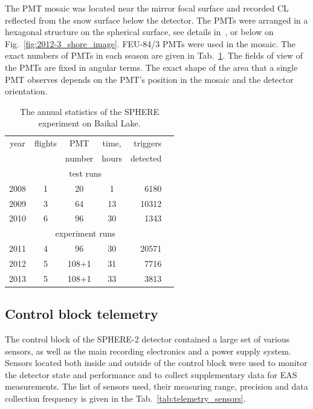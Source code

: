 \documentclass[preprint,5p,times]{elsarticle}
\begin{document}
The PMT mosaic was located near the mirror focal surface and recorded CL reflected from the snow surface below the detector. The PMTs were arranged in a hexagonal structure on the spherical surface, see details in~\cite{Ant20}, or below on Fig.~\ref{fig:2012-3_shore_image}. FEU-84/3 PMTs were used in the mosaic. The exact numbers of PMTs in each season are given in Tab.~\ref{tab:statistics}. The fields of view of the PMTs are fixed in angular terms. The exact shape of the area that a single PMT observes depends on the PMT's position in the mosaic and the detector orientation.

\begin{table}[tb]
\centering
\caption{The annual statistics of the SPHERE experiment on Baikal Lake.
}
\label{tab:statistics}
\vspace{1pc}
\begin{tabular}{|c||c|c|c|r|r|}
    \hline
    year  & flights & PMT    & time, & triggers \\ 
          &         & number & hours & detected \\ 
    \hline \hline
    \multicolumn{5}{|c|}{test runs} \\
    \hline
    2008 & 1 &  20 &  1 &  6180 \\ 
    2009 & 3 &  64 & 13 & 10312 \\ 
    2010 & 6 &  96 & 30 &  1343 \\
    \hline
    \multicolumn{5}{|c|}{experiment runs} \\
    \hline
    2011 & 4 &  96 & 30 & 20571 \\
    2012 & 5 & 108+1 & 31 &  7716 \\
    2013 & 5 & 108+1 & 33 &  3813 \\
    \hline
\end{tabular}
\end{table}

\subsection{Control block telemetry}

The control block of the SPHERE-2 detector contained a large set of various sensors, as well as the main recording electronics and a power supply system. Sensors located both inside and outside of the control block were used to monitor the detector state and performance and to collect supplementary data for EAS measurements. The list of sensors used, their measuring range, precision and data collection frequency is given in the Tab.~\ref{tab:telemetry_sensors}. 
\end{document}
